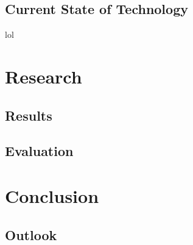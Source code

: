 \documentclass[
  twoside,
  11pt, a4paper,
  footinclude=true,
  headinclude=true,
  cleardoublepage=empty
]{scrreprt}
\begin{document}
\section{Current State of Technology}
lol
\lipsum[1]

\chapter{Research}
\lipsum[1]

\section{Results}
\lipsum[1]

\section{Evaluation}
\lipsum[1]

\chapter{Conclusion}
\lipsum[1]

\section{Outlook}
\lipsum[1]

\listoffigures
 
\listoftables



    
\end{document}
